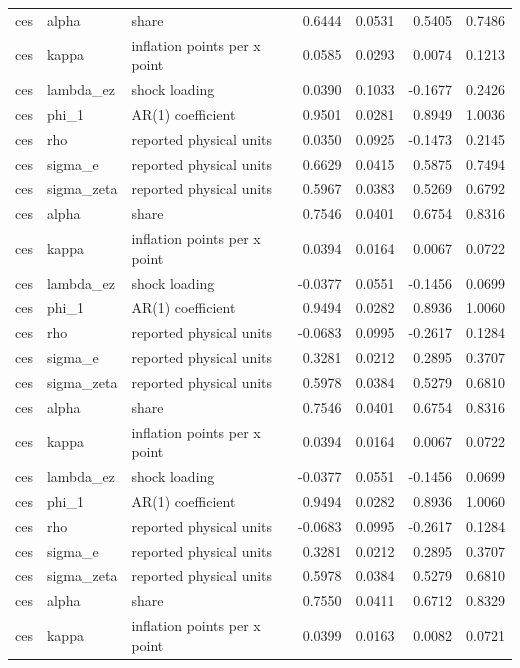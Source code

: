\begin{tabular}{lllrrrr}
ces & alpha & share & 0.6444 & 0.0531 & 0.5405 & 0.7486 \\
ces & kappa & inflation points per x point & 0.0585 & 0.0293 & 0.0074 & 0.1213 \\
ces & lambda\_ez & shock loading & 0.0390 & 0.1033 & -0.1677 & 0.2426 \\
ces & phi\_1 & AR(1) coefficient & 0.9501 & 0.0281 & 0.8949 & 1.0036 \\
ces & rho & reported physical units & 0.0350 & 0.0925 & -0.1473 & 0.2145 \\
ces & sigma\_e & reported physical units & 0.6629 & 0.0415 & 0.5875 & 0.7494 \\
ces & sigma\_zeta & reported physical units & 0.5967 & 0.0383 & 0.5269 & 0.6792 \\
ces & alpha & share & 0.7546 & 0.0401 & 0.6754 & 0.8316 \\
ces & kappa & inflation points per x point & 0.0394 & 0.0164 & 0.0067 & 0.0722 \\
ces & lambda\_ez & shock loading & -0.0377 & 0.0551 & -0.1456 & 0.0699 \\
ces & phi\_1 & AR(1) coefficient & 0.9494 & 0.0282 & 0.8936 & 1.0060 \\
ces & rho & reported physical units & -0.0683 & 0.0995 & -0.2617 & 0.1284 \\
ces & sigma\_e & reported physical units & 0.3281 & 0.0212 & 0.2895 & 0.3707 \\
ces & sigma\_zeta & reported physical units & 0.5978 & 0.0384 & 0.5279 & 0.6810 \\
ces & alpha & share & 0.7546 & 0.0401 & 0.6754 & 0.8316 \\
ces & kappa & inflation points per x point & 0.0394 & 0.0164 & 0.0067 & 0.0722 \\
ces & lambda\_ez & shock loading & -0.0377 & 0.0551 & -0.1456 & 0.0699 \\
ces & phi\_1 & AR(1) coefficient & 0.9494 & 0.0282 & 0.8936 & 1.0060 \\
ces & rho & reported physical units & -0.0683 & 0.0995 & -0.2617 & 0.1284 \\
ces & sigma\_e & reported physical units & 0.3281 & 0.0212 & 0.2895 & 0.3707 \\
ces & sigma\_zeta & reported physical units & 0.5978 & 0.0384 & 0.5279 & 0.6810 \\
ces & alpha & share & 0.7550 & 0.0411 & 0.6712 & 0.8329 \\
ces & kappa & inflation points per x point & 0.0399 & 0.0163 & 0.0082 & 0.0721 \\

\end{tabular}
